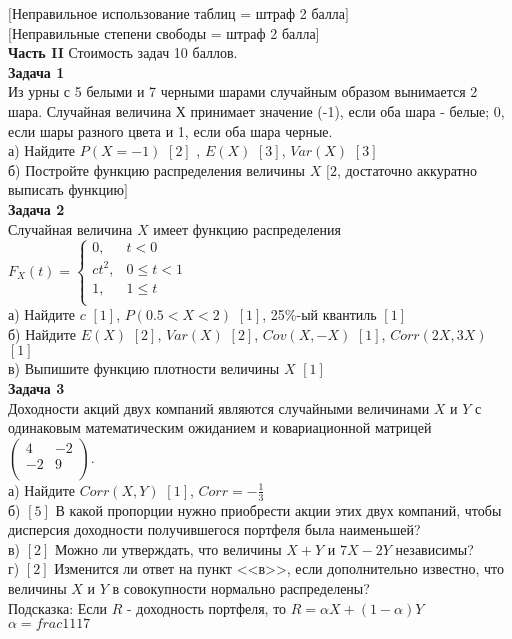 \documentclass[pdftex,12pt,a4paper]{article}
\begin{document}
$[$Неправильное использование таблиц = штраф 2 балла$]$ \\
$[$Неправильные степени свободы = штраф 2 балла$]$ \\

\pagebreak \textbf{Часть II} Стоимость задач 10 баллов. \\


\textbf{Задача 1} \\ %
Из урны с 5 белыми и 7 черными шарами случайным образом вынимается
2 шара. Случайная величина $Х$ принимает значение (-1), если оба
шара - белые; 0, если шары разного цвета и 1, если оба шара
черные. \\
а) Найдите $P(X=-1)$ $[2]$ , $E(X)$ $[3]$, $Var(X)$ $[3]$ \\
б) Постройте функцию распределения величины $X$ $[2$, достаточно аккуратно выписать функцию$]$ \\



\textbf{Задача 2} \\ %
Случайная величина $X$ имеет функцию распределения
$F_{X}(t)=\left\{\begin{array}{ll}
  0, & t<0 \\
  ct^{2}, & 0\le t <1 \\
  1, & 1\le t \\
\end{array} \right.$ \\
а) Найдите $c$ $[1]$, $P(0.5<X<2)$ $[1]$, 25\%-ый квантиль $[1]$ \\
б) Найдите $E(X)$ $[2]$, $Var(X)$ $[2]$, $Cov(X,-X)$ $[1]$, $Corr(2X,3X)$ $[1]$ \\
в) Выпишите функцию плотности величины $X$ $[1]$ \\


\textbf{Задача 3} \\ %
Доходности акций двух компаний являются случайными величинами $X$
и $Y$ с одинаковым математическим ожиданием и ковариационной
матрицей  $\left(%
\begin{array}{cc}
  4 & -2 \\
  -2 & 9 \\
\end{array}%
\right).$ \\
а) Найдите $Corr(X,Y)$  $[1]$, $Corr=-\frac{1}{3}$\\
б) $[5]$ В какой пропорции нужно приобрести акции этих двух
компаний,
чтобы дисперсия доходности получившегося портфеля была наименьшей? \\
в)  $[2]$ Можно ли утверждать, что величины $X+Y$ и $7X-2Y$ независимы? \\
г) $[2]$ Изменится ли ответ на пункт <<в>>, если дополнительно
известно,
что величины $X$ и $Y$ в совокупности нормально распределены? \\
Подсказка: Если $R$ - доходность портфеля, то $R=\alpha
X+(1-\alpha)Y$ \\
$\alpha=frac{11}{17}$ \\
\end{document}
